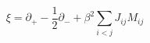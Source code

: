 \begin{equation}
\label{killvec}
\xi = \partial_+ - \frac{1}{2} \partial_- + \beta^2 \sum_{i<j} J_{ij} M_{ij}
\end{equation}

